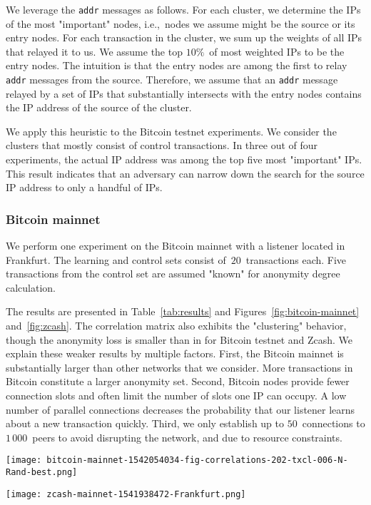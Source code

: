 We leverage the \texttt{addr} messages as follows.
For each cluster, we determine the IPs of the most "important" nodes, i.e.,~nodes we assume might be the source or its entry nodes.
For each transaction in the cluster, we sum up the weights of all IPs that relayed it to us.
We assume the top $10\%$~of most weighted IPs to be the entry nodes.
The intuition is that the entry nodes are among the first to relay \texttt{addr} messages from the source.
Therefore, we assume that an \texttt{addr} message relayed by a set of IPs that substantially intersects with the entry nodes contains the IP address of the source of the cluster.

We apply this heuristic to the Bitcoin testnet experiments.
We consider the clusters that mostly consist of control transactions.
In three out of four experiments, the actual IP address was among the top five most "important" IPs.
This result indicates that an adversary can narrow down the search for the source IP address to only a handful of IPs.

\subsubsection{Bitcoin mainnet}

We perform one experiment on the Bitcoin mainnet with a listener located in Frankfurt.
The learning and control sets consist of~$20$~transactions each.
Five transactions from the control set are assumed "known" for anonymity degree calculation.

The results are presented in Table~\ref{tab:results} and Figures~\ref{fig:bitcoin-mainnet} and~\ref{fig:zcash}.
The correlation matrix also exhibits the "clustering" behavior, though the anonymity loss is smaller than in for Bitcoin testnet and Zcash.
We explain these weaker results by multiple factors.
First, the Bitcoin mainnet is substantially larger than other networks that we consider.
More transactions in Bitcoin constitute a larger anonymity set.
Second, Bitcoin nodes provide fewer connection slots and often limit the number of slots one IP can occupy.
A low number of parallel connections decreases the probability that our listener learns about a new transaction quickly.
Third, we only establish up to $50$~connections to $1\,000$~peers to avoid disrupting the network, and due to resource constraints.

\begin{figure*}
	\centering
	\begin{minipage}{0.5\textwidth}
		\centering
		\texttt{[image: bitcoin-mainnet-1542054034-fig-correlations-202-txcl-006-N-Rand-best.png]}
		\caption{Transaction clustering for Bitcoin mainnet.}
		\label{fig:bitcoin-mainnet}
	\end{minipage}\hfill
	\begin{minipage}{0.5\textwidth}
		\centering
		\texttt{[image: zcash-mainnet-1541938472-Frankfurt.png]}
		\caption{Transaction clustering for Zcash.}
		\label{fig:zcash}
	\end{minipage}\hfill
\end{figure*}

